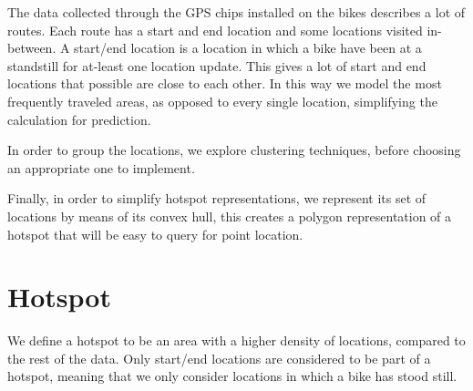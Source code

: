 The data collected through the GPS chips installed on the bikes describes a lot of routes.
Each route has a start and end location and some locations visited in-between. A start/end location is a location in which a bike have been at a standstill for at-least one location update.
This gives a lot of start and end locations that possible are close to each other.
In this way we model the most frequently traveled areas, as opposed to every single location, simplifying the calculation for prediction.

In order to group the locations, we explore clustering techniques, before choosing an appropriate one to implement.

Finally, in order to simplify hotspot representations, we represent its set of locations by means of its convex hull, this creates a polygon representation of a hotspot that will be easy to query for point location.

\section{Hotspot}\label{hotspot}
We define a hotspot to be an area with a higher density of locations, compared to the rest of the data. Only start/end locations are considered to be part of a hotspot, meaning that we only consider locations in which a bike has stood still.